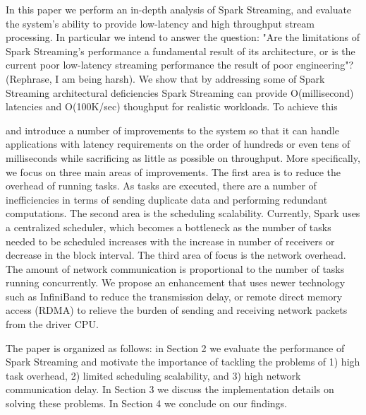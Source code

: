 In this paper we perform an in-depth analysis of Spark Streaming, and evaluate the system's ability to provide low-latency and high throughput stream processing.
In particular we intend to answer the question: "Are the limitations of Spark Streaming's performance a fundamental result of its architecture, or is the current poor low-latency streaming performance
the result of poor engineering"? (Rephrase, I am being harsh).
We show that by addressing some of Spark Streaming architectural deficiencies Spark Streaming can provide O(millisecond) latencies and O(100K/sec) thoughput for realistic workloads. 
To achieve this

   and introduce a number of improvements to the system so that it can handle applications with latency requirements on the order of hundreds or even tens of milliseconds while sacrificing as little as possible on throughput. More specifically, we focus on three main areas of improvements. The first area is to reduce the overhead of running tasks. As tasks are executed, there are a number of inefficiencies in terms of sending duplicate data and performing redundant computations. The second area is the scheduling scalability. Currently, Spark uses a centralized scheduler, which becomes a bottleneck as the number of tasks needed to be scheduled increases with the increase in number of receivers or decrease in the block interval. The third area of focus is the network overhead. The amount of network communication is proportional to the number of tasks running concurrently. We propose an enhancement that uses newer technology such as InfiniBand to reduce the transmission delay, or remote direct memory access (RDMA) to relieve the burden of sending and receiving network packets from the driver CPU.

The paper is organized as follows: in Section 2 we evaluate the performance of Spark Streaming and motivate the importance of tackling the problems of 1) high task overhead, 2) limited scheduling scalability, and 3) high network communication delay. In Section 3 we discuss the implementation details on solving these problems. In Section 4 we conclude on our findings.


